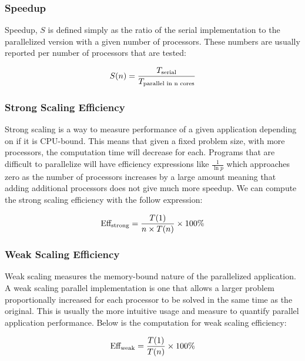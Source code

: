 \documentclass[letterpaper,12pt]{article}
\begin{document}
\subsubsection{Speedup}

Speedup, $S$ is defined simply as the ratio of the serial implementation to the parallelized version with a given number of processors. These numbers are usually reported per number of processors that are tested:

\begin{equation}
S(n) = \frac{T_\textnormal{serial}}{T_\textnormal{parallel in n cores}}
\end{equation}

\subsubsection{Strong Scaling Efficiency}

Strong scaling is a way to measure performance of a given application depending on if it is CPU-bound. This means that given a fixed problem size, with more processors, the computation time will decrease for each. Programs that are difficult to parallelize will have efficiency expressions like $\frac{1}{\ln p}$ which approaches zero as the number of processors increases by a large amount meaning that adding additional processors does not give much more speedup. We can compute the strong scaling efficiency with the follow expression:

\begin{equation}
\textnormal{Eff}_{\textnormal{strong}} = \frac{T(1)}{n \times T(n)} \times 100\%
\end{equation}

\subsubsection{Weak Scaling Efficiency}

Weak scaling measures the memory-bound nature of the parallelized application. A weak scaling parallel implementation is one that allows a larger problem proportionally increased for each processor to be solved in the same time as the original. This is usually the more intuitive usage and measure to quantify parallel application performance. Below is the computation for weak scaling efficiency:

\begin{equation}
\textnormal{Eff}_{\textnormal{weak}} = \frac{T(1)}{T(n)} \times 100\%
\end{equation}
\end{document}
